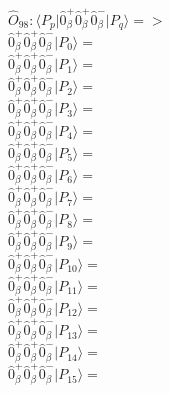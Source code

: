 \documentclass[14pt]{article}
\begin{document}
    $\hat{O}_{98}:  \langle{P_p}\vert \hat{0}_{\beta}^{+}\hat{0}_{\beta}^{+}\hat{0}_{\beta}^{-} \vert{P_q}\rangle => $ \\ 
    $ \hat{0}_{\beta}^{+}\hat{0}_{\beta}^{+}\hat{0}_{\beta}^{-} \vert{P_{0}}\rangle =  $ \\ 
    $ \hat{0}_{\beta}^{+}\hat{0}_{\beta}^{+}\hat{0}_{\beta}^{-} \vert{P_{1}}\rangle =  $ \\ 
    $ \hat{0}_{\beta}^{+}\hat{0}_{\beta}^{+}\hat{0}_{\beta}^{-} \vert{P_{2}}\rangle =  $ \\ 
    $ \hat{0}_{\beta}^{+}\hat{0}_{\beta}^{+}\hat{0}_{\beta}^{-} \vert{P_{3}}\rangle =  $ \\ 
    $ \hat{0}_{\beta}^{+}\hat{0}_{\beta}^{+}\hat{0}_{\beta}^{-} \vert{P_{4}}\rangle =  $ \\ 
    $ \hat{0}_{\beta}^{+}\hat{0}_{\beta}^{+}\hat{0}_{\beta}^{-} \vert{P_{5}}\rangle =  $ \\ 
    $ \hat{0}_{\beta}^{+}\hat{0}_{\beta}^{+}\hat{0}_{\beta}^{-} \vert{P_{6}}\rangle =  $ \\ 
    $ \hat{0}_{\beta}^{+}\hat{0}_{\beta}^{+}\hat{0}_{\beta}^{-} \vert{P_{7}}\rangle =  $ \\ 
    $ \hat{0}_{\beta}^{+}\hat{0}_{\beta}^{+}\hat{0}_{\beta}^{-} \vert{P_{8}}\rangle =  $ \\ 
    $ \hat{0}_{\beta}^{+}\hat{0}_{\beta}^{+}\hat{0}_{\beta}^{-} \vert{P_{9}}\rangle =  $ \\ 
    $ \hat{0}_{\beta}^{+}\hat{0}_{\beta}^{+}\hat{0}_{\beta}^{-} \vert{P_{10}}\rangle =  $ \\ 
    $ \hat{0}_{\beta}^{+}\hat{0}_{\beta}^{+}\hat{0}_{\beta}^{-} \vert{P_{11}}\rangle =  $ \\ 
    $ \hat{0}_{\beta}^{+}\hat{0}_{\beta}^{+}\hat{0}_{\beta}^{-} \vert{P_{12}}\rangle =  $ \\ 
    $ \hat{0}_{\beta}^{+}\hat{0}_{\beta}^{+}\hat{0}_{\beta}^{-} \vert{P_{13}}\rangle =  $ \\ 
    $ \hat{0}_{\beta}^{+}\hat{0}_{\beta}^{+}\hat{0}_{\beta}^{-} \vert{P_{14}}\rangle =  $ \\ 
    $ \hat{0}_{\beta}^{+}\hat{0}_{\beta}^{+}\hat{0}_{\beta}^{-} \vert{P_{15}}\rangle =  $ \\ 
    
\end{document}
